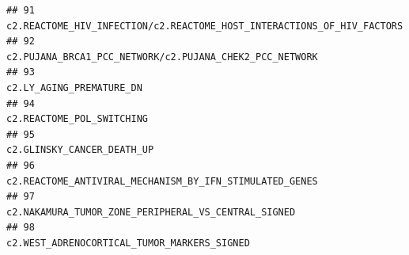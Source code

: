 \documentclass{article}\usepackage[]{graphicx}\usepackage[]{color}
\makeatletter
\newenvironment{kframe}{%
 \def\at@end@of@kframe{}%
 \ifinner\ifhmode%
  \def\at@end@of@kframe{\end{minipage}}%
  \begin{minipage}{\columnwidth}%
 \fi\fi%
 \def\FrameCommand##1{\hskip\@totalleftmargin \hskip-\fboxsep
 \colorbox{shadecolor}{##1}\hskip-\fboxsep
     \hskip-\linewidth \hskip-\@totalleftmargin \hskip\columnwidth}%
 \MakeFramed {\advance\hsize-\width
   \@totalleftmargin\z@ \linewidth\hsize
   \@setminipage}}%
 {\par\unskip\endMakeFramed%
 \at@end@of@kframe}
\newenvironment{knitrout}{}{} %
\makeatother
\begin{document}
\begin{knitrout}
\begin{kframe}
\begin{verbatim}
## 91                                                                                                                                                                                                                                                                                 c2.REACTOME_HIV_INFECTION/c2.REACTOME_HOST_INTERACTIONS_OF_HIV_FACTORS
## 92                                                                                                                                                                                                                                                                                                c2.PUJANA_BRCA1_PCC_NETWORK/c2.PUJANA_CHEK2_PCC_NETWORK
## 93                                                                                                                                                                                                                                                                                                                               c2.LY_AGING_PREMATURE_DN
## 94                                                                                                                                                                                                                                                                                                                              c2.REACTOME_POL_SWITCHING
## 95                                                                                                                                                                                                                                                                                                                             c2.GLINSKY_CANCER_DEATH_UP
## 96                                                                                                                                                                                                                                                                                                c2.REACTOME_ANTIVIRAL_MECHANISM_BY_IFN_STIMULATED_GENES
## 97                                                                                                                                                                                                                                                                                                    c2.NAKAMURA_TUMOR_ZONE_PERIPHERAL_VS_CENTRAL_SIGNED
## 98                                                                                                                                                                                                                                                                                                            c2.WEST_ADRENOCORTICAL_TUMOR_MARKERS_SIGNED

\end{verbatim}
\end{kframe}
\end{knitrout}
\end{document}
